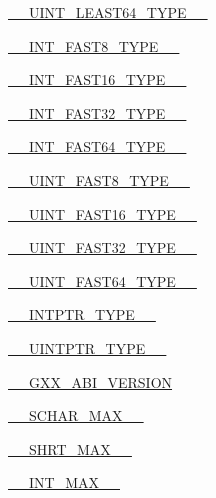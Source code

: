 \begin{DoxyCompactItemize}
\hyperlink{CMakeCache_8txt_afb89ddd568254fb1f9e5eeb6fdb13d0b}{\+\_\+\+\_\+\+U\+I\+N\+T\+\_\+\+L\+E\+A\+S\+T64\+\_\+\+T\+Y\+P\+E\+\_\+\+\_\+}
\item 
\hyperlink{CMakeCache_8txt_a200c99a73bb9894a85b11b122e3e26d0}{\+\_\+\+\_\+\+I\+N\+T\+\_\+\+F\+A\+S\+T8\+\_\+\+T\+Y\+P\+E\+\_\+\+\_\+}
\item 
\hyperlink{CMakeCache_8txt_a0c08f8106efbb6105db009f25e8d8664}{\+\_\+\+\_\+\+I\+N\+T\+\_\+\+F\+A\+S\+T16\+\_\+\+T\+Y\+P\+E\+\_\+\+\_\+}
\item 
\hyperlink{CMakeCache_8txt_ae5117fe8af2968c8df646c90f5eb24d4}{\+\_\+\+\_\+\+I\+N\+T\+\_\+\+F\+A\+S\+T32\+\_\+\+T\+Y\+P\+E\+\_\+\+\_\+}
\item 
\hyperlink{CMakeCache_8txt_a7ed6af681304005196de13467b9442d5}{\+\_\+\+\_\+\+I\+N\+T\+\_\+\+F\+A\+S\+T64\+\_\+\+T\+Y\+P\+E\+\_\+\+\_\+}
\item 
\hyperlink{CMakeCache_8txt_a41340f1e822a8ea4d6994bba627339fd}{\+\_\+\+\_\+\+U\+I\+N\+T\+\_\+\+F\+A\+S\+T8\+\_\+\+T\+Y\+P\+E\+\_\+\+\_\+}
\item 
\hyperlink{CMakeCache_8txt_a2231ce950df5d5eaf1dc88cb718b4569}{\+\_\+\+\_\+\+U\+I\+N\+T\+\_\+\+F\+A\+S\+T16\+\_\+\+T\+Y\+P\+E\+\_\+\+\_\+}
\item 
\hyperlink{CMakeCache_8txt_ad5e5c8a8bb834a4f9d47edfe6ec88204}{\+\_\+\+\_\+\+U\+I\+N\+T\+\_\+\+F\+A\+S\+T32\+\_\+\+T\+Y\+P\+E\+\_\+\+\_\+}
\item 
\hyperlink{CMakeCache_8txt_aa588b63d52e2735c82b0262ae2034b2e}{\+\_\+\+\_\+\+U\+I\+N\+T\+\_\+\+F\+A\+S\+T64\+\_\+\+T\+Y\+P\+E\+\_\+\+\_\+}
\item 
\hyperlink{CMakeCache_8txt_ac93efd8e9d485881d53ab451f844c8ec}{\+\_\+\+\_\+\+I\+N\+T\+P\+T\+R\+\_\+\+T\+Y\+P\+E\+\_\+\+\_\+}
\item 
\hyperlink{CMakeCache_8txt_a835a336a71d176cb81526e3e2acf8343}{\+\_\+\+\_\+\+U\+I\+N\+T\+P\+T\+R\+\_\+\+T\+Y\+P\+E\+\_\+\+\_\+}
\item 
\hyperlink{CMakeCache_8txt_af2a3b27e09cc851abc4ef3e7daea66c2}{\+\_\+\+\_\+\+G\+X\+X\+\_\+\+A\+B\+I\+\_\+\+V\+E\+R\+S\+I\+ON}
\item 
\hyperlink{CMakeCache_8txt_ad1e3a625f5463100aab8db5fedf63d52}{\+\_\+\+\_\+\+S\+C\+H\+A\+R\+\_\+\+M\+A\+X\+\_\+\+\_\+}
\item 
\hyperlink{CMakeCache_8txt_aaa2dae7d1963575bc4e3e95e3fee9ed4}{\+\_\+\+\_\+\+S\+H\+R\+T\+\_\+\+M\+A\+X\+\_\+\+\_\+}
\item 
\hyperlink{CMakeCache_8txt_a9fce70495bb7d54b8b4adc9f7f63ea8e}{\+\_\+\+\_\+\+I\+N\+T\+\_\+\+M\+A\+X\+\_\+\+\_\+}

\end{DoxyCompactItemize}
